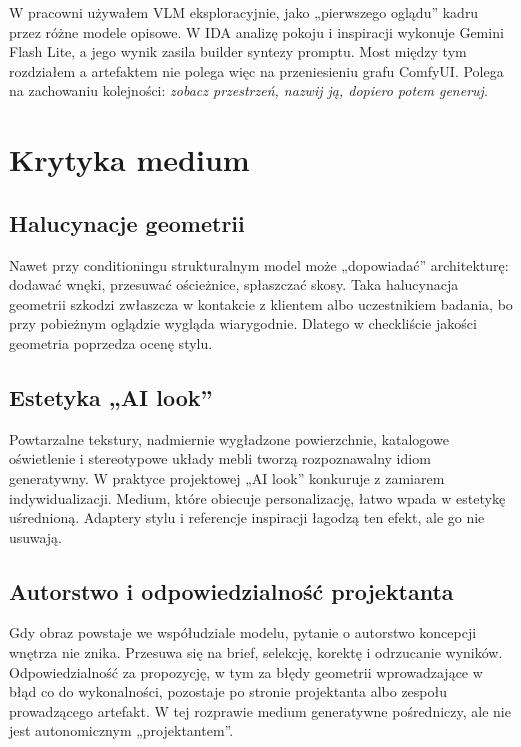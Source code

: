 W pracowni używałem VLM eksploracyjnie, jako „pierwszego oglądu” kadru przez różne modele opisowe. W IDA analizę pokoju i inspiracji wykonuje Gemini Flash Lite, a jego wynik zasila builder syntezy promptu.
Most między tym rozdziałem a artefaktem nie polega więc na przeniesieniu grafu ComfyUI. Polega na zachowaniu kolejności: \emph{zobacz przestrzeń, nazwij ją, dopiero potem generuj}.

\section{Krytyka medium}
\label{ch04:sec:krytyka}

\subsection{Halucynacje geometrii}
Nawet przy conditioningu strukturalnym model może „dopowiadać” architekturę: dodawać wnęki, przesuwać ościeżnice, spłaszczać skosy. Taka halucynacja geometrii szkodzi zwłaszcza w kontakcie z klientem albo uczestnikiem badania, bo przy pobieżnym oglądzie wygląda wiarygodnie.
Dlatego w checkliście jakości geometria poprzedza ocenę stylu.

\subsection{Estetyka „AI look”}
Powtarzalne tekstury, nadmiernie wygładzone powierzchnie, katalogowe oświetlenie i stereotypowe układy mebli tworzą rozpoznawalny idiom generatywny. W praktyce projektowej „AI look” konkuruje z zamiarem indywidualizacji.
Medium, które obiecuje personalizację, łatwo wpada w estetykę uśrednioną. Adaptery stylu i referencje inspiracji łagodzą ten efekt, ale go nie usuwają.

\subsection{Autorstwo i odpowiedzialność projektanta}
Gdy obraz powstaje we współudziale modelu, pytanie o autorstwo koncepcji wnętrza nie znika. Przesuwa się na brief, selekcję, korektę i odrzucanie wyników.
Odpowiedzialność za propozycję, w tym za błędy geometrii wprowadzające w błąd co do wykonalności, pozostaje po stronie projektanta albo zespołu prowadzącego artefakt. W tej rozprawie medium generatywne pośredniczy, ale nie jest autonomicznym „projektantem”.

